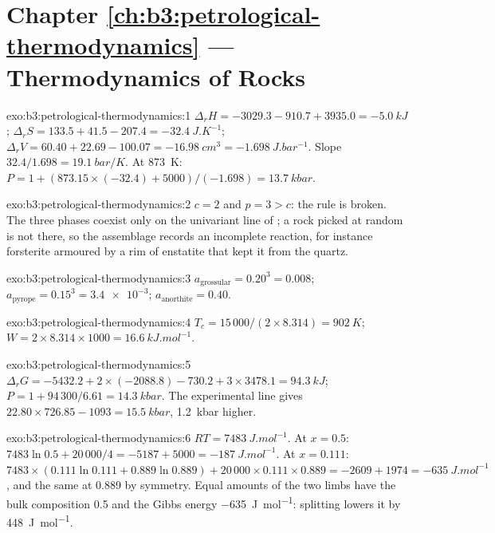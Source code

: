 \section*{Chapter \ref{ch:b3:petrological-thermodynamics} --- Thermodynamics of Rocks}

\begin{solution}{exo:b3:petrological-thermodynamics:1}
$\Delta_rH = -3029.3 - 910.7 + 3935.0 = \qty{-5.0}{kJ}$; $\Delta_rS = 133.5 +
41.5 - 207.4 = \qty{-32.4}{J.K^{-1}}$; $\Delta_rV = 60.40 + 22.69 - 100.07 =
\qty{-16.98}{cm^3} = \qty{-1.698}{J.bar^{-1}}$. Slope $32.4/1.698 =
\qty{19.1}{bar/K}$. At \qty{873}{K}: $P = 1 + (873.15\times(-32.4) +
5000)/(-1.698) = \qty{13.7}{kbar}$.
\end{solution}

\begin{solution}{exo:b3:petrological-thermodynamics:2}
$c = 2$ and $p = 3 > c$: the rule is broken. The three phases coexist only on
the univariant line of ; a rock picked at
random is not there, so the assemblage records an incomplete reaction, for
instance forsterite armoured by a rim of enstatite that kept it from the
quartz.
\end{solution}

\begin{solution}{exo:b3:petrological-thermodynamics:3}
$a_{\text{grossular}} = 0.20^3 = 0.008$; $a_{\text{pyrope}} = 0.15^3 =
\num{3.4e-3}$; $a_{\text{anorthite}} = 0.40$.
\end{solution}

\begin{solution}{exo:b3:petrological-thermodynamics:4}
$T_c = 15\,000/(2\times8.314) = \qty{902}{K}$; $W = 2\times8.314\times1000
= \qty{16.6}{kJ.mol^{-1}}$.
\end{solution}

\begin{solution}{exo:b3:petrological-thermodynamics:5}
$\Delta_rG = -5432.2 + 2\times(-2088.8) - 730.2 + 3\times3478.1 =
\qty{94.3}{kJ}$; $P = 1 + 94\,300/6.61 = \qty{14.3}{kbar}$. The experimental
line gives $22.80\times726.85 - 1093 = \qty{15.5}{kbar}$, \qty{1.2}{kbar}
higher.
\end{solution}

\begin{solution}{exo:b3:petrological-thermodynamics:6}
$RT = \qty{7483}{J.mol^{-1}}$. At $x = 0.5$: $7483\ln0.5 + 20\,000/4 = -5187 +
5000 = \qty{-187}{J.mol^{-1}}$. At $x = 0.111$: $7483\times(0.111\ln0.111 +
0.889\ln0.889) + 20\,000\times0.111\times0.889 = -2609 + 1974 =
\qty{-635}{J.mol^{-1}}$, and the same at 0.889 by symmetry. Equal amounts of
the two limbs have the bulk composition 0.5 and the Gibbs energy
\qty{-635}{J.mol^{-1}}: splitting lowers it by \qty{448}{J.mol^{-1}}.
\end{solution}

